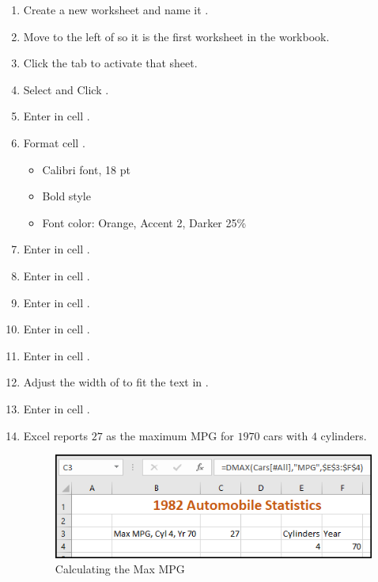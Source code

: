 \begin{enumerate}
	\item Create a new worksheet and name it .
	\item Move  to the left of  so it is the first worksheet in the workbook.
	\item Click the  tab to activate that sheet.
	\item Select  and Click .
	\item Enter  in cell .
	\item Format cell .
	
	\begin{itemize}
		\item Calibri font, 18 pt
		\item Bold style
		\item Font color: Orange, Accent 2, Darker 25\%
	\end{itemize}
	
	\item Enter  in cell .
	\item Enter  in cell .
	\item Enter  in cell .
	\item Enter  in cell .
	
	\item Enter  in cell .
	\item Adjust the width of  to fit the text in .
	\item Enter  in cell .
	\item Excel reports $ 27 $ as the maximum MPG for $ 1970 $ cars with $ 4 $ cylinders.
	
	\begin{figure}[H]
		\centering
		\includegraphics[width=\maxwidth{.95\linewidth}]{gfx/ch09_fig71}
		\caption{Calculating the Max MPG}
		\label{09:fig71}
	\end{figure}
	

\end{enumerate}
